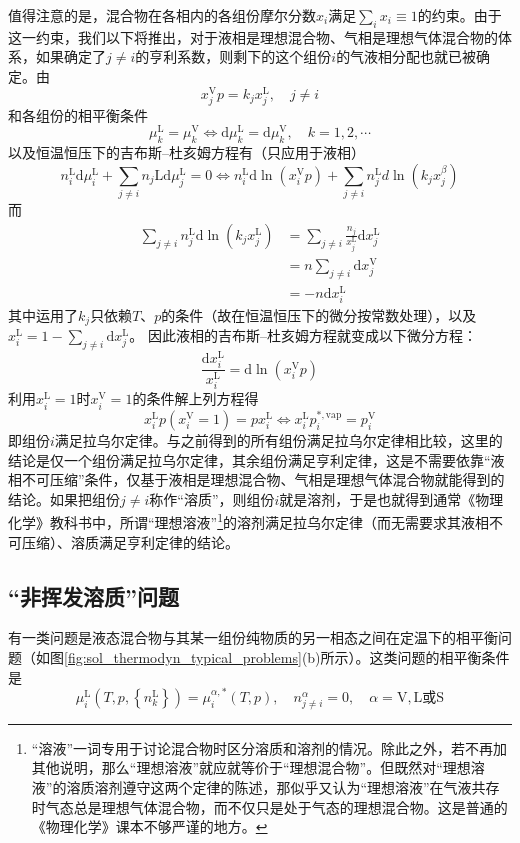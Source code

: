 \documentclass[main.tex]{subfiles}
\begin{document}
值得注意的是，混合物在各相内的各组份摩尔分数$x_i$满足$\sum_ix_i\equiv 1$的约束。由于这一约束，我们以下将推出，对于液相是理想混合物、气相是理想气体混合物的体系，如果确定了$j\neq i$的亨利系数，则剩下的这个组份$i$的气液相分配也就已被确定。由
\[x_j^\text{V}p=k_jx_j^\text{L},\quad j\neq i\]
和各组份的相平衡条件
\[\mu_k^\text{L}=\mu_k^\text{V}\Leftrightarrow \mathrm{d}\mu_k^\text{L}=\mathrm{d}\mu_k^\text{V},\quad k=1,2,\cdots\]
以及恒温恒压下的吉布斯--杜亥姆方程有（只应用于液相）
\[
    n_i^\text{L}\mathrm{d}\mu_i^\text{L}+\sum_{j\neq i}n_j\text{L}\mathrm{d}\mu_j^\text{L}=0\Leftrightarrow n_i^\text{L}\mathrm{d}\ln\left(x_i^\text{V}p\right)+\sum_{j\neq i}n_j^\text{L}d\ln\left(k_jx_j^\beta\right)
\]
而
\begin{align*}
    \sum_{j\neq i}n_j^\text{L}\mathrm{d}\ln\left(k_j x_j^\text{L}\right) & =\sum_{j\neq i}\frac{n_j}{x_j^\text{L}}\mathrm{d}x_j^\text{L} \\
                                                                         & =n\sum_{j\neq i}\mathrm{d}x_j^\text{V}                        \\
                                                                         & =-n\mathrm{d}x_i^\text{L}
\end{align*}
其中运用了$k_j$只依赖$T$、$p$的条件（故在恒温恒压下的微分按常数处理），以及$x_i^\text{L}=1-\sum_{j\neq i}\mathrm{d}x_j^\text{L}$。
因此液相的吉布斯--杜亥姆方程就变成以下微分方程：
\[\frac{\mathrm{d}x_i^\text{L}}{x_i^\text{L}}=\mathrm{d}\ln\left(x_i^\text{V}p\right)\]
利用$x_i^\text{L}=1$时$x_i^\text{V}=1$的条件解上列方程得
\[x_i^\text{L}p\left(x_i^\text{V}= 1\right)=p x_i^\text{L}\Leftrightarrow x_i^\text{L}p_i^{*,\text{vap}}=p^\text{V}_i\]
即组份$i$满足拉乌尔定律。与之前得到的所有组份满足拉乌尔定律相比较，这里的结论是仅一个组份满足拉乌尔定律，其余组份满足亨利定律，这是不需要依靠“液相不可压缩”条件，仅基于液相是理想混合物、气相是理想气体混合物就能得到的结论。如果把组份$j\neq i$称作“溶质”，则组份$i$就是溶剂，于是也就得到通常《物理化学》教科书中，所谓“理想溶液”\footnote{“溶液”一词专用于讨论混合物时区分溶质和溶剂的情况。除此之外，若不再加其他说明，那么“理想溶液”就应就等价于“理想混合物”。但既然对“理想溶液”的溶质溶剂遵守这两个定律的陈述，那似乎又认为“理想溶液”在气液共存时气态总是理想气体混合物，而不仅只是处于气态的理想混合物。这是普通的《物理化学》课本不够严谨的地方。}的溶剂满足拉乌尔定律（而无需要求其液相不可压缩）、溶质满足亨利定律的结论。

\subsection{“非挥发溶质”问题}
有一类问题是液态混合物与其某一组份纯物质的另一相态之间在定温下的相平衡问题（如图\ref{fig:sol_thermodyn_typical_problems}(b)所示）。这类问题的相平衡条件是
\begin{equation}\label{eq:II.5_phase_eq_non_volatile}
    \mu_i^\text{L}\left(T,p,\left\{n_k^\text{L}\right\}\right)=\mu_i^{\alpha,*}\left(T,p\right),\quad n_{j\neq i}^\alpha=0,\quad \alpha=\text{V},\text{L或S}
\end{equation}
\end{document}
